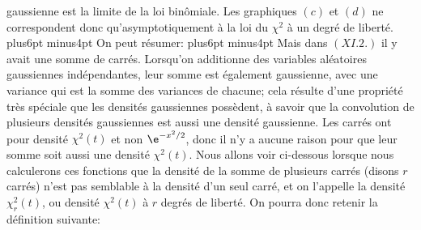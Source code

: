 gaussienne est la limite de la loi bin\^omiale. Les graphiques $(c)$ et $(d)$ ne correspondent donc qu'asymptotiquement
\`a la loi du $\chi^2$ \`a un degr\'e de libert\'e. 
\vskip12pt plus6pt minus4pt
On peut r\'esumer:
\medskip
{}
\vskip12pt plus6pt minus4pt
Mais dans $(XI.2.)$ il y avait une somme de carr\'es. Lorsqu'on addi\-tionne
des variables al\'eatoires gaussiennes ind\'ependantes, leur somme est
\'egalement gaussienne, avec une variance qui est la somme des 
variances de chacune;  cela r\'esulte d'une propri\'et\'e tr\`es
sp\'eciale que les densit\'es gaus\-siennes poss\`edent, \`a savoir
que la convolution de plusieurs densit\'es gaus\-siennes est aussi une
densit\'e gaus\-sienne. Les carr\'es ont pour densit\'e $\chi^2(t)$ et non
$\e^{-x^2/2}$, donc il n'y a aucune raison pour que leur somme soit aussi 
une densit\'e $\chi^2(t)$. Nous allons voir ci-dessous lorsque nous
calculerons ces fonctions que la densit\'e de la somme de plusieurs
carr\'es (disons $r$ carr\'es) n'est pas semblable \`a la densit\'e d'un 
seul carr\'e, et on l'appelle la densit\'e $\chi_r^2(t)$, ou densit\'e
$\chi^2(t)$ \`a $r$ degr\'es de libert\'e. 
\bigskip
On pourra donc retenir la d\'efinition suivante:
\medskip
{}

\bigskip

